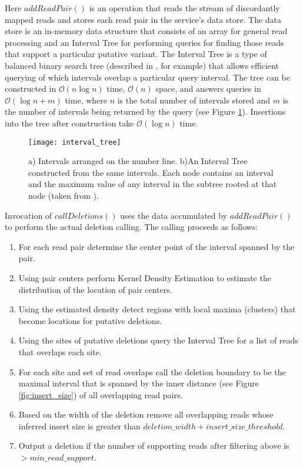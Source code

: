 Here $addReadPair()$ is an operation that reads the stream of discordantly mapped reads and stores each read pair in the service's data store. The data store is an in-memory data structure that consists of an array for general read processing and an Interval Tree for performing queries for finding those reads that support a particular putative variant. The Interval Tree is a type of balanced binary search tree (described in \autocite{cormen2009introduction}, for example) that allows efficient querying of which intervals overlap a particular query interval. The tree can be constructed in $\mathcal{O}(n\log{}n)$ time, $\mathcal{O}(n)$ space, and answers queries in $\mathcal{O}(\log{}n + m)$ time, where $n$ is the total number of intervals stored and $m$ is the number of intervals being returned by the query (see Figure \ref{fig:interval_tree}). Insertions into the tree after construction take $\mathcal{O}(\log{}n)$ time.

\begin{figure}[H]
    \texttt{[image: interval\_tree]}
    \centering
    \caption {a) Intervals arranged on the number line. b)An Interval Tree constructed from the same intervals. Each node contains an interval and the maximum value of any interval in the subtree rooted at that node (taken from \autocite{cormen2009introduction}).}
    \label{fig:interval_tree}
\end{figure}

Invocation of $callDeletions()$ uses the data accumulated by $addReadPair()$ to perform the actual deletion calling. The calling proceeds as follows:

\begin{enumerate}
    \item For each read pair determine the center point of the interval spanned by the pair.
    \item Using pair centers perform Kernel Density Estimation\autocites{rosenblatt1956remarks}{parzen1962estimation} to estimate the distribution of the location of pair centers.
    \item Using the estimated density detect regions with local maxima (clusters) that become locations for putative deletions.
    \item Using the sites of putative deletions query the Interval Tree for a list of reads that overlaps each site.
    \item For each site and set of read overlaps call the deletion boundary to be the maximal interval that is spanned by the inner distance (see Figure \ref{fig:insert_size}) of all overlapping read pairs.
    \item Based on the width of the deletion remove all overlapping reads whose inferred insert size is greater than $deletion\_width + insert\_size\_threshold$.
    \item Output a deletion if the number of supporting reads after filtering above is $> min\_read\_support$.
\end{enumerate}

